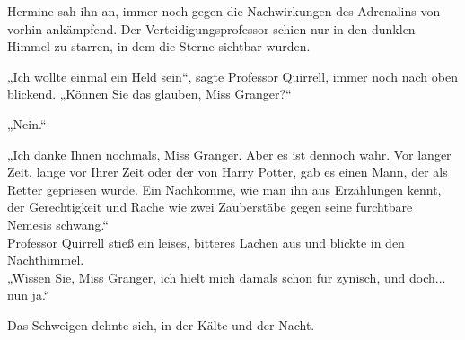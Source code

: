 {Hermine sah ihn an, immer noch gegen die Nachwirkungen des Adrenalins von vorhin ankämpfend. Der Verteidigungsprofessor schien nur in den dunklen Himmel zu starren, in dem die Sterne sichtbar wurden.

„Ich wollte einmal ein Held sein“, sagte Professor Quirrell, immer noch nach oben blickend. „Können Sie das glauben, Miss Granger?“

„Nein.“

„Ich danke Ihnen nochmals, Miss Granger. Aber es ist dennoch wahr. Vor langer Zeit, lange vor Ihrer Zeit oder der von Harry Potter, gab es einen Mann, der als Retter gepriesen wurde. Ein Nachkomme, wie man ihn aus Erzählungen kennt, der Gerechtigkeit und Rache wie zwei Zauberstäbe gegen seine furchtbare Nemesis schwang.“\\ Professor Quirrell stieß ein leises, bitteres Lachen aus und blickte in den Nachthimmel.\\ „Wissen Sie, Miss Granger, ich hielt mich damals schon für zynisch, und doch... nun ja.“

Das Schweigen dehnte sich, in der Kälte und der Nacht.

}
